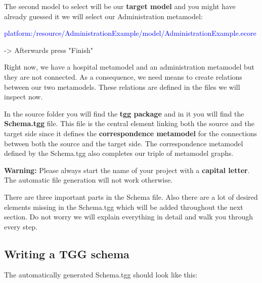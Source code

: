 The second model to select will be our \textbf{target model} and you might have already guessed it we will select our Administration metamodel: \newline

\centering

\textcolor{Blue}{\textsf{platform:/resource/AdministrationExample/model/AdministrationExample.ecore}}\newline

-> Afterwards press \textsf{"Finish"}\newline

\raggedright

Right now, we have a hospital metamodel and an administration metamodel but they are not connected. As a consequence, we need means to create relations between our two metamodels. These relations are defined in the files we will inspect now.

In the source folder you will find the \textbf{tgg package} and in it you will find the \textbf{Schema.tgg} file. This file is the central element linking both the source and the target side since it defines the \textbf{correspondence metamodel} for the connections between both the source and the target side. The correspondence metamodel defined by the Schema.tgg also completes our triple of metamodel graphs.\newline

\textbf{Warning:} Please always start the name of your project with a \textbf{capital letter}. The automatic file generation will not work otherwise.\newline

There are three important parts in the Schema file. Also there are a lot of desired elements missing in the Schema.tgg which will be added throughout the next section. Do not worry we will explain everything in detail and walk you through every step.
\clearpage

\subsection{Writing a TGG schema}

The automatically generated Schema.tgg should look like this:\newline


